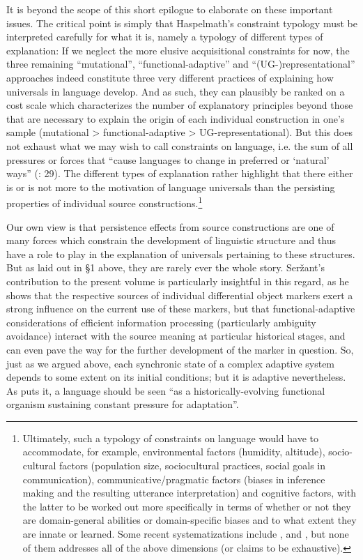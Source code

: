 \documentclass[output=paper]{langsci/langscibook}
\begin{document}
It is beyond the scope of this short epilogue to elaborate on these important issues. The critical point is simply that Haspelmath’s constraint typology must be interpreted carefully for what it is, namely a typology of different types of explanation: If we neglect the more elusive acquisitional constraints for now, the three remaining “mutational”, “functional-adaptive” and “(UG-)representational” approaches indeed constitute three very different practices of explaining how universals in language develop. And as such, they can plausibly be ranked on a cost scale which characterizes the number of explanatory principles beyond those that are necessary to explain the origin of each individual construction in one’s sample (mutational > functional-adaptive > UG-representational). But this does not exhaust what we may wish to call constraints on language, i.e. the sum of all pressures or forces that “cause languages to change in preferred or ‘natural’ ways” (\citealt{BickelEtAl2015}: 29). The different types of explanation rather highlight that there either is or is not more to the motivation of language universals than the persisting properties of individual source constructions.\footnote{Ultimately, such a typology of constraints on language would have to accommodate, for example, environmental factors (humidity, altitude), socio-cultural factors (population size, sociocultural practices, social goals in communication), communicative/pragmatic factors (biases in inference making and the resulting utterance interpretation) and cognitive factors, with the latter to be worked out more specifically in terms of whether or not they are domain-general abilities or domain-specific biases and to what extent they are innate or learned. Some recent systematizations include \citet{ChristiansenChater2008}, \citet{EvansLevinson2009} and \citet{Bybee2010}, but none of them addresses all of the above dimensions (or claims to be exhaustive).} 

Our own view is that persistence effects from source constructions are one of many forces which constrain the development of linguistic structure and thus have a role to play in the explanation of universals pertaining to these structures. But as laid out in §1 above, they are rarely ever the whole story. Seržant’s contribution to the present volume is particularly insightful in this regard, as he shows that the respective sources of individual differential object markers exert a strong influence on the current use of these markers, but that functional-adaptive considerations of efficient information processing (particularly ambiguity avoidance) interact with the source meaning at particular historical stages, and can even pave the way for the further development of the marker in question. So, just as we argued above, each synchronic state of a complex adaptive system depends to some extent on its initial conditions; but it is adaptive nevertheless. As \citet[263]{Shibatani2006} puts it, a language should be seen “as a historically-evolving functional organism sustaining constant pressure for adaptation”. 
\end{document}
